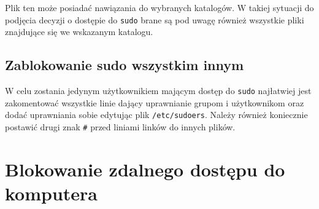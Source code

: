 \documentclass{article}
\begin{document}
Plik ten może posiadać nawiązania do wybranych katalogów. W takiej sytuacji do podjęcia decyzji o dostępie do \texttt{sudo} brane są pod uwagę również wszystkie pliki znajdujące się we wskazanym katalogu.

\subsection{Zablokowanie sudo wszystkim innym}
W celu zostania jedynym użytkownikiem mającym dostęp do \texttt{sudo} najłatwiej jest zakomentować wszystkie linie dający uprawnianie grupom i użytkownikom oraz dodać uprawniania sobie edytując plik \texttt{/etc/sudoers}. Należy również koniecznie postawić drugi znak \texttt{\#} przed liniami linków do innych plików.

\section{Blokowanie zdalnego dostępu do komputera}
\end{document}
